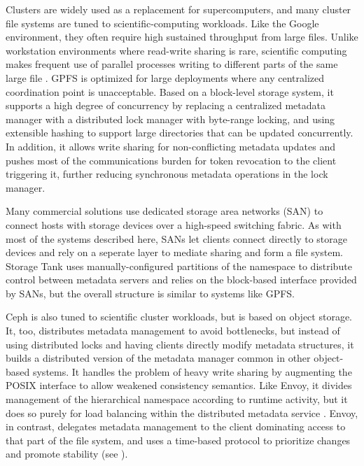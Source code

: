 Clusters are widely used as a replacement for supercomputers, and many cluster file systems are tuned to scientific-computing workloads. Like the Google environment, they often require high sustained throughput from large files. Unlike workstation environments where read-write sharing is rare, scientific computing makes frequent use of parallel processes writing to different parts of the same large file \cite{wang04}. GPFS \cite{schmuck} is optimized for large deployments where any centralized coordination point is unacceptable. Based on a block-level storage system, it supports a high degree of concurrency by replacing a centralized metadata manager with a distributed lock manager with byte-range locking, and using extensible hashing to support large directories that can be updated concurrently. In addition, it allows write sharing for non-conflicting metadata updates and pushes most of the communications burden for token revocation to the client triggering it, further reducing synchronous metadata operations in the lock manager.

Many commercial solutions use dedicated storage area networks (SAN) to connect hosts with storage devices over a high-speed switching fabric. As with most of the systems described here, SANs let clients connect directly to storage devices and rely on a seperate layer to mediate sharing and form a file system. Storage Tank \cite{menon} uses manually-configured partitions of the namespace to distribute control between metadata servers and relies on the block-based interface provided by SANs, but the overall structure is similar to systems like GPFS.

Ceph \cite{weil06} is also tuned to scientific cluster workloads, but is based on object storage. It, too, distributes metadata management to avoid bottlenecks, but instead of using distributed locks and having clients directly modify metadata structures, it builds a distributed version of the metadata manager common in other object-based systems. It handles the problem of heavy write sharing by augmenting the POSIX interface to allow weakened consistency semantics. Like Envoy, it divides management of the hierarchical namespace according to runtime activity, but it does so purely for load balancing within the distributed metadata service \cite{weil04}. Envoy, in contrast, delegates metadata management to the client dominating access to that part of the file system, and uses a time-based protocol to prioritize changes and promote stability (see ).

